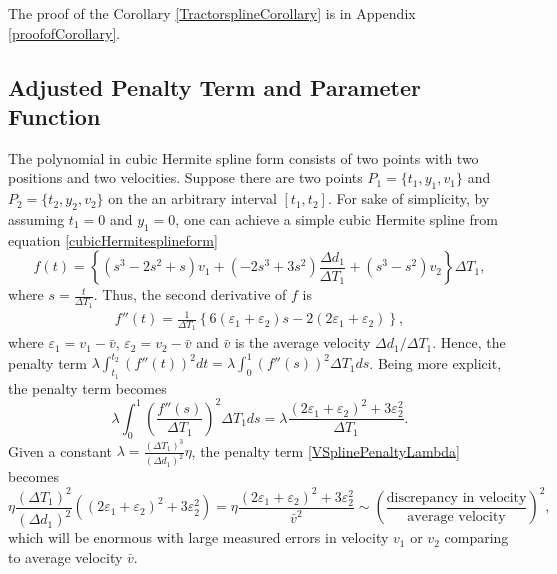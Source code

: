 The proof of the Corollary \ref{TractorsplineCorollary} is in Appendix \ref{proofofCorollary}. 


\subsection{Adjusted Penalty Term and Parameter Function}


The polynomial in cubic Hermite spline form consists of two points with two positions and two velocities. Suppose there are two points $P_1=\{t_1,y_1,v_1\}$ and $P_2=\{t_2,y_2,v_2\}$ on the an arbitrary interval $[t_1,t_2]$. For sake of simplicity, by assuming $t_1=0$ and $y_1=0$, one can achieve a simple cubic Hermite spline from equation \eqref{cubicHermitesplineform} 
\begin{equation*}
f(t) =\left\{ \left(s^3-2s^2+s\right) v_1+\left(-2s^3+3s^2\right)\frac{\Delta d_1}{\Delta T_1}+\left(s^3-s^2\right)v_2 \right\}\Delta T_1, 
\end{equation*}
where $s=\frac{t}{\Delta T_1}$. Thus, the second derivative of $f$ is  
\begin{align*}
f''(t)=\frac{1}{\Delta T_1}\left\{ 6\left(\varepsilon_1+\varepsilon_2\right)s-2\left(2\varepsilon_1+\varepsilon_2\right)\right\},
\end{align*}
where $\varepsilon_1=v_1-\bar{v}$, $\varepsilon_2=v_2-\bar{v}$ and $\bar{v}$ is the average velocity $\Delta d_1/\Delta T_1$. Hence, the penalty term $\lambda \int_{t_1}^{t_2}\left(f''(t)\right)^2dt = \lambda \int_0^1 \left(f''(s)\right)^2\Delta T_1 ds$. Being more explicit, the penalty term becomes 
\begin{equation}\label{VSplinePenaltyLambda}
\lambda \int_0^1\left( \frac{f''(s)}{\Delta T_1}\right)^2\Delta T_1 ds = \lambda \frac{\left(2\varepsilon_1+\varepsilon_2\right)^2+3\varepsilon_2^2}{\Delta T_1}. 
\end{equation}
Given a constant $\lambda = \frac{\left(\Delta T_1\right)^3}{\left(\Delta d_1\right)^2}\eta$, the penalty term \eqref{VSplinePenaltyLambda} becomes
\begin{equation}\label{APTintroequation}
\eta \frac{\left(\Delta T_1\right)^2}{\left(\Delta d_1\right)^2} \left(\left(2\varepsilon_1+\varepsilon_2\right)^2+3\varepsilon_2^2\right)= \eta \frac{\left(2\varepsilon_1+\varepsilon_2\right)^2+3\varepsilon_2^2}{\bar{v}^2}\sim \left(\frac{\mbox{discrepancy in velocity}}{\mbox{average velocity}}\right)^2, 
\end{equation}
which will be enormous with large measured errors in velocity $v_1$ or $v_2$ comparing to average velocity $\bar{v}$. 

